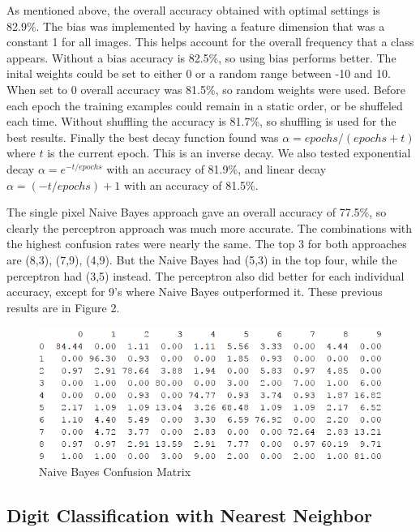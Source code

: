 \documentclass{article}[12pt]
\begin{document}
   As mentioned above, the overall accuracy obtained with optimal settings is 82.9\%. The bias was implemented by having a feature dimension that was a constant 1 for all images. This helps account for the overall frequency that a class appears. Without a bias accuracy is 82.5\%, so using bias performs better. The inital weights could be set to either 0 or a random range between -10 and 10. When set to 0 overall accuracy was 81.5\%, so random weights were used. Before each epoch the training examples could remain in a static order, or be shuffeled each time. Without shuffling the accuracy is 81.7\%, so shuffling is used for the best results. Finally the best decay function found was $\alpha=epochs/(epochs+t)$ where $t$ is the current epoch. This is an inverse decay. We also tested exponential decay $\alpha = e^{-t/epochs}$ with an accuracy of 81.9\%, and linear decay $\alpha = (-t/epochs)+1$ with an accuracy of 81.5\%.
  
   The single pixel Naive Bayes approach gave an overall accuracy of 77.5\%, so clearly the perceptron approach was much more accurate. The combinations with the highest confusion rates were nearly the same. The top 3 for both approaches are (8,3), (7,9), (4,9). But the Naive Bayes had (5,3) in the top four, while the perceptron had (3,5) instead. The perceptron also did better for each individual accuracy, except for 9's where Naive Bayes outperformed it. These previous results are in Figure 2.
   
    \begin{figure}[!htb]
   	\centering
   	\includegraphics[scale=0.5]{confusion_nb.png}
   	\caption{Naive Bayes Confusion Matrix}
   	\label{fig:cm21}
   \end{figure}
   
   \newpage
   
  \subsection{Digit Classification with Nearest Neighbor}
\end{document}
